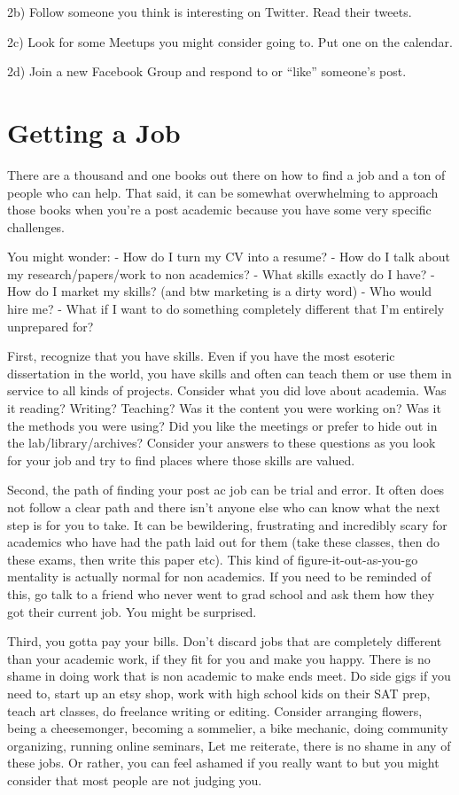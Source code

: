 \documentclass[]{book}
\theoremstyle{definition}
\theoremstyle{definition}
\theoremstyle{definition}
\theoremstyle{remark}
\begin{document}
2b) Follow someone you think is interesting on Twitter. Read their
tweets.

2c) Look for some Meetups you might consider going to. Put one on the
calendar.

2d) Join a new Facebook Group and respond to or ``like'' someone's post.

\chapter{Getting a Job}\label{getting-a-job}

There are a thousand and one books out there on how to find a job and a
ton of people who can help. That said, it can be somewhat overwhelming
to approach those books when you're a post academic because you have
some very specific challenges.

You might wonder: - How do I turn my CV into a resume? - How do I talk
about my research/papers/work to non academics? - What skills exactly do
I have? - How do I market my skills? (and btw marketing is a dirty word)
- Who would hire me? - What if I want to do something completely
different that I'm entirely unprepared for?

First, recognize that you have skills. Even if you have the most
esoteric dissertation in the world, you have skills and often can teach
them or use them in service to all kinds of projects. Consider what you
did love about academia. Was it reading? Writing? Teaching? Was it the
content you were working on? Was it the methods you were using? Did you
like the meetings or prefer to hide out in the lab/library/archives?
Consider your answers to these questions as you look for your job and
try to find places where those skills are valued.

Second, the path of finding your post ac job can be trial and error. It
often does not follow a clear path and there isn't anyone else who can
know what the next step is for you to take. It can be bewildering,
frustrating and incredibly scary for academics who have had the path
laid out for them (take these classes, then do these exams, then write
this paper etc). This kind of figure-it-out-as-you-go mentality is
actually normal for non academics. If you need to be reminded of this,
go talk to a friend who never went to grad school and ask them how they
got their current job. You might be surprised.

Third, you gotta pay your bills. Don't discard jobs that are completely
different than your academic work, if they fit for you and make you
happy. There is no shame in doing work that is non academic to make ends
meet. Do side gigs if you need to, start up an etsy shop, work with high
school kids on their SAT prep, teach art classes, do freelance writing
or editing. Consider arranging flowers, being a cheesemonger, becoming a
sommelier, a bike mechanic, doing community organizing, running online
seminars, Let me reiterate, there is no shame in any of these jobs. Or
rather, you can feel ashamed if you really want to but you might
consider that most people are not judging you.
\end{document}
